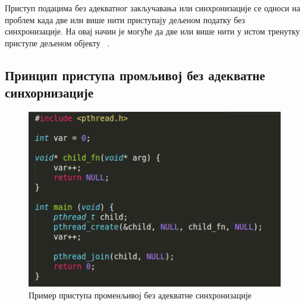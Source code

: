 \documentclass[12pt,oneside]{memoir}
\begin{document}
\indent Приступ подацима без адекватног закључавања или синхронизације се односи на проблем када две или више нити приступају дељеном податку без синхронизације. На овај начин је могуће да две или више нити у истом тренутку приступе дељеном објекту ~\cite{helgrindRef}. 

\subsection{Принцип приступа промљивој без адекватне синхорнизације}

\begin{figure}[h!]
\begin{center}
\includegraphics[scale=0.75]{slika14.png}
\end{center}
\caption{Пример приступа променљивој без адекватне синхронизације}
\label{fig:main4}
\end{figure}
\end{document}
